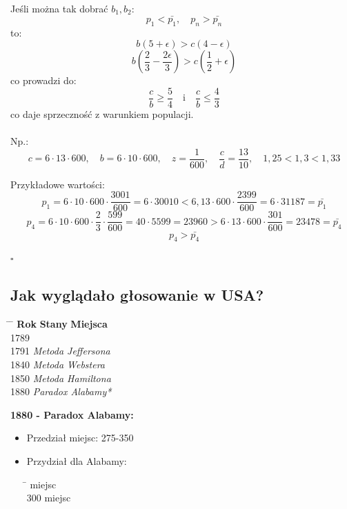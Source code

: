 \documentclass[12pt,a4paper]{article}
\theoremstyle{break}
\begin{document}
	Jeśli można tak dobrać $b_1, b_2$:
	\[
	p_1 < \bar{p_1}, \quad p_n > \bar{p_n}
	\]
	to:
	\[
	b(5 + \epsilon) > c(4 - \epsilon)
	\]
	\[
	b\left(\frac{2}{3} - \frac{2\epsilon}{3}\right) > c\left(\frac{1}{2} + \epsilon\right)
	\]
	co prowadzi do:
	\[
	\frac{c}{b} \geq \frac{5}{4} \quad \text{i} \quad \frac{c}{b} \leq \frac{4}{3}
	\]
	co daje sprzeczność z warunkiem populacji.\\\\
	
	Np.:
	\[
	c = 6 \cdot 13 \cdot 600, \quad b = 6 \cdot 10 \cdot 600, \quad z = \frac{1}{600}, \quad \frac{c}{d} = \frac{13}{10}, \quad 1,25 < 1,3 < 1,33
	\]
	
	Przykładowe wartości:
	\[
	p_1 = 6 \cdot 10 \cdot 600 \cdot \frac{3001}{600} = 6 \cdot 30010 < 6,13 \cdot 600 \cdot \frac{2399}{600} = 6 \cdot 31187 = \bar{p_1}
	\]
	\[
	p_4 = 6 \cdot 10 \cdot 600 \cdot \frac{2}{3} \cdot \frac{599}{600} = 40 \cdot 5599 = 23960 > 6 \cdot 13 \cdot 600 \cdot \frac{301}{600} = 23478 = \bar{p_4}
	\]
	\[
	p_4 > \bar{p_4}
	\]

	\begin{flushright}
		$\square$
	\end{flushright}
	\newpage
	\subsection{Jak wyglądało głosowanie w USA?}
	
	\begin{tabbing}
		\hspace{4cm} \= \hspace{3cm} \= \kill
		\textbf{Rok} \> \textbf{Stany} \> \textbf{Miejsca} \\
		1789   \\
		1791   \quad \textit{Metoda Jeffersona} \\
		1840 \>  \quad \textit{Metoda Webstera} \\
		1850 \>  \quad \textit{Metoda Hamiltona} \\
		1880 \>  \quad \textit{Paradox Alabamy*} \\
	\end{tabbing}
	
	\noindent \textbf{1880 - Paradox Alabamy:}
	
	\begin{itemize}
		\item Przedział miejsc: 275-350
		\item Przydział dla Alabamy:
		\begin{tabbing}
			\hspace{2cm} \= \hspace{3cm}   miejsc \\
			300  miejsc \\
		\end{tabbing}
	\end{itemize}
	
\end{document}
